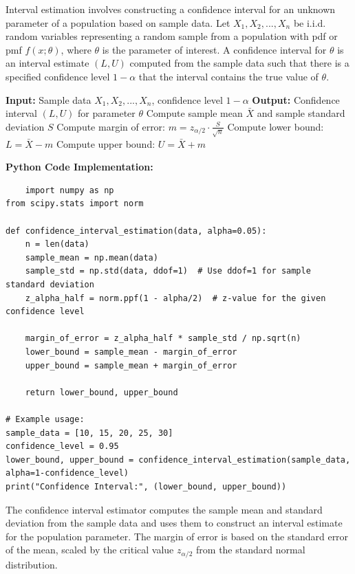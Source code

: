 \documentclass[12pt]{book} %
\begin{document}
Interval estimation involves constructing a confidence interval for an unknown parameter of a population based on sample data. Let \(X_1, X_2, ..., X_n\) be i.i.d. random variables representing a random sample from a population with pdf or pmf \(f(x; \theta)\), where \(\theta\) is the parameter of interest. A confidence interval for \(\theta\) is an interval estimate \((L, U)\) computed from the sample data such that there is a specified confidence level \(1 - \alpha\) that the interval contains the true value of \(\theta\).
\FloatBarrier
\begin{algorithm}[H]
\caption{Confidence Interval Estimation}
\begin{algorithmic}[1]
\State \textbf{Input:} Sample data \(X_1, X_2, ..., X_n\), confidence level \(1 - \alpha\)
\State \textbf{Output:} Confidence interval \((L, U)\) for parameter \(\theta\)
\State Compute sample mean \(\bar{X}\) and sample standard deviation \(S\)
\State Compute margin of error: \(m = z_{\alpha/2} \cdot \frac{S}{\sqrt{n}}\)
\State Compute lower bound: \(L = \bar{X} - m\)
\State Compute upper bound: \(U = \bar{X} + m\)
\end{algorithmic}
\end{algorithm}
\FloatBarrier
\textbf{Python Code Implementation:}
\FloatBarrier
\begin{lstlisting}
    import numpy as np
from scipy.stats import norm

def confidence_interval_estimation(data, alpha=0.05):
    n = len(data)
    sample_mean = np.mean(data)
    sample_std = np.std(data, ddof=1)  # Use ddof=1 for sample standard deviation
    z_alpha_half = norm.ppf(1 - alpha/2)  # z-value for the given confidence level

    margin_of_error = z_alpha_half * sample_std / np.sqrt(n)
    lower_bound = sample_mean - margin_of_error
    upper_bound = sample_mean + margin_of_error

    return lower_bound, upper_bound

# Example usage:
sample_data = [10, 15, 20, 25, 30]
confidence_level = 0.95
lower_bound, upper_bound = confidence_interval_estimation(sample_data, alpha=1-confidence_level)
print("Confidence Interval:", (lower_bound, upper_bound))
\end{lstlisting}
\FloatBarrier
The confidence interval estimator computes the sample mean and standard deviation from the sample data and uses them to construct an interval estimate for the population parameter. The margin of error is based on the standard error of the mean, scaled by the critical value \(z_{\alpha/2}\) from the standard normal distribution.
\end{document}
